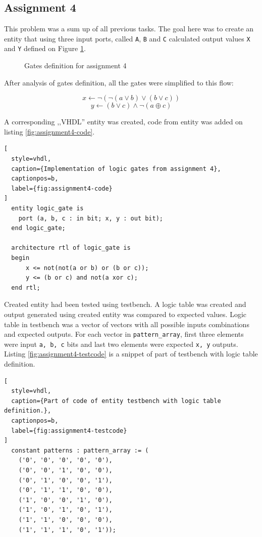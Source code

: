 \subsection{Assignment 4}

This problem was a sum up of all previous tasks. The goal here was to create
an entity that using three input ports, called \texttt{A}, \texttt{B} and
\texttt{C} calculated output values \texttt{X} and \texttt{Y} defined on
Figure \ref{fig:assignment4-gates}.

\begin{figure}[!htb]
  \caption{\label{fig:assignment4-gates} Gates definition for assignment 4}
\end{figure}

After analysis of gates definition, all the gates were simplified to this flow:

$$ x \leftarrow \neg (\neg(a \lor b) \lor (b \lor c)) $$
$$ y \leftarrow (b \lor c) \land \neg(a \oplus c) $$

A corresponding ,,VHDL'' entity was created, code from entity was added on
listing \ref{fig:assignment4-code}.

\begin{lstlisting}[
  style=vhdl,
  caption={Implementation of logic gates from assignment 4},
  captionpos=b,
  label={fig:assignment4-code}
]
  entity logic_gate is
    port (a, b, c : in bit; x, y : out bit);
  end logic_gate;

  architecture rtl of logic_gate is
  begin
      x <= not(not(a or b) or (b or c));
      y <= (b or c) and not(a xor c);
  end rtl;
\end{lstlisting}

Created entity had been tested using testbench. A logic table was created
and output generated using created entity was compared to expected values.
Logic table in testbench was a vector of vectors with all possible
inputs combinations and expected outputs. For each vector in \texttt{pattern\_array},
first three elements were input \texttt{a, b, c} bits and last two elements
were expected \texttt{x, y} outputs. Listing \ref{fig:assignment4-testcode}
is a snippet of part of testbench with logic table definition.


\begin{lstlisting}[
  style=vhdl,
  caption={Part of code of entity testbench with logic table definition.},
  captionpos=b,
  label={fig:assignment4-testcode}
]
  constant patterns : pattern_array := (
    ('0', '0', '0', '0', '0'),
    ('0', '0', '1', '0', '0'),
    ('0', '1', '0', '0', '1'),
    ('0', '1', '1', '0', '0'),
    ('1', '0', '0', '1', '0'),
    ('1', '0', '1', '0', '1'),
    ('1', '1', '0', '0', '0'),
    ('1', '1', '1', '0', '1'));
\end{lstlisting}